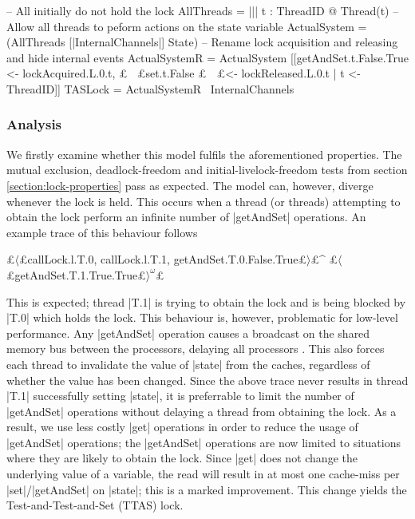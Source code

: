 
\begin{cspm}
  -- All initially do not hold the lock
  AllThreads = ||| t : ThreadID @ Thread(t)
  -- Allow all threads to peform actions on the state variable
  ActualSystem = (AllThreads [|InternalChannels|] State)
  -- Rename lock acquisition and releasing and hide internal events
  ActualSystemR = ActualSystem 
                    [[getAndSet.t.False.True <- lockAcquired.L.0.t, 
                     £$\!\!\:\:\!\!\:\!\:$£set.t.False            £$\!\!\:\:\!\!\:\!\;$£<- lockReleased.L.0.t  | t <- ThreadID]]
  TASLock = ActualSystemR \ InternalChannels
\end{cspm}

\subsubsection{Analysis}

We firstly examine whether this model fulfils the aforementioned properties. The mutual exclusion, deadlock-freedom and initial-livelock-freedom tests from section \ref{section:lock-properties} pass as expected. The model can, however, diverge whenever the lock is held. This occurs when a thread (or threads) attempting to obtain the lock perform an infinite number of |getAndSet| operations. An example trace of this behaviour follows
\begin{cspm}
  £$\langle$£callLock.l.T.0, callLock.l.T.1, getAndSet.T.0.False.True£$\rangle$£^
    £$\langle$£getAndSet.T.1.True.True£$\rangle^\omega$£
\end{cspm}
  
This is expected; thread |T.1| is trying to obtain the lock and is being blocked by |T.0| which holds the lock. This behaviour is, however, problematic for low-level performance. Any |getAndSet| operation causes a broadcast on the shared memory bus between the processors, delaying all processors \cite{TAoMP}. This also forces each thread to invalidate the value of |state| from the caches, regardless of whether the value has been changed. Since the above trace never results in thread |T.1| successfully setting |state|, it is preferrable to limit the number of |getAndSet| operations without delaying a thread from obtaining the lock. As a result, we use less costly |get| operations in order to reduce the usage of |getAndSet| operations; the |getAndSet| operations are now limited to situations where they are likely to obtain the lock. Since |get| does not change the underlying value of a variable, the read will result in at most one cache-miss per |set|/|getAndSet| on |state|; this is a marked improvement. This change yields the Test-and-Test-and-Set (TTAS) lock.%


